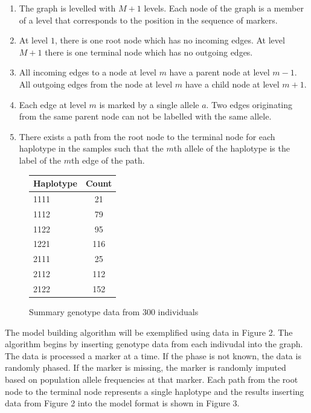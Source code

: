 \documentclass[a4paper,11pt,twoside,abstraction,titlepage]{article}
\begin{document}
\vspace{-5pt}
\begin{enumerate}
\itemsep0pt
\item The graph is levelled with $M+1$ levels. Each node of the graph is a member of a level that corresponds to the position in the sequence of markers.
\item At level $1$, there is one root node which has no incoming edges.  At level $M+1$ there is one terminal node which has no outgoing edges.
\item All incoming edges to a node at level $m$ have a parent node at level $m-1$.  All outgoing edges from the node at level $m$ have a child node at level $m+1$.
\item Each edge at level $m$ is marked by a single allele $a$.  Two edges originating from the same parent node can not be labelled with the same allele.
\item There exists a path from the root node to the terminal node for each haplotype in the samples such that the $m$th allele of the haplotype is the label of the $m$th edge of the path.
\end{enumerate}


\begin{figure}[htp]
\centering
\begin{tabular}{lc}
\toprule
Haplotype & Count \\
\midrule
1111 & 21\\ 
1112 &  79\\
1122 & 95\\
1221 & 116 \\
2111 & 25\\
2112 & 112\\
2122 & 152\\
\bottomrule 
\end{tabular}
\vspace{5pt}
\caption{Summary genotype data from 300 individuals}

\vspace{-5pt}
\end{figure}


\noindent The model building algorithm will be exemplified using data in Figure 2.   The algorithm begins by inserting genotype data from each indivudal into the graph.  The data is processed a marker at a time.  If the phase is not known, the data is randomly phased.  If the marker is missing, the marker is randomly imputed based on population allele frequencies at that marker.  Each path from the root node to the terminal node represents a single haplotype and the results inserting data from Figure 2 into the model format is shown in Figure 3.
\end{document}
